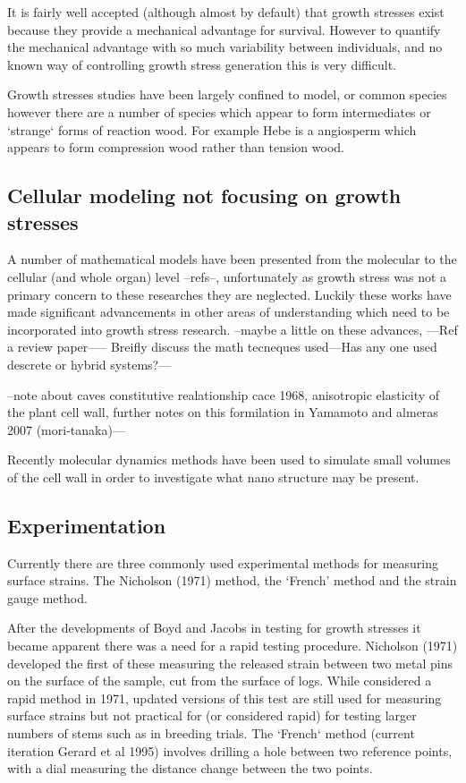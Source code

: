 \documentclass{article}
\begin{document}
It is fairly well accepted (although almost by default) that growth stresses
exist because they provide a mechanical advantage for survival. However to
quantify the mechanical advantage with so much variability between individuals,
and no known way of controlling growth stress generation this is very difficult.

Growth stresses studies have been largely confined to model, or common species
however there are a number of species which appear to form intermediates or
`strange` forms of reaction wood. For example Hebe is a angiosperm which appears
to form compression wood rather than tension wood.

\subsection{Cellular modeling not focusing on growth stresses}
A number of mathematical models have been presented from the
molecular to the cellular (and whole organ) level --refs--, unfortunately as
growth stress was not a primary concern to these researches they are neglected.
Luckily these works have made significant advancements in other areas of
understanding which need to be incorporated into growth stress research. --maybe
a little on these advances, ---Ref a review paper----- Breifly discuss the math
tecneques used---Has any one used descrete or hybrid systems?---

--note about caves constitutive realationship cace 1968, anisotropic
elasticity of the plant cell wall, further notes on this formilation in Yamamoto
and almeras 2007 (mori-tanaka)---

Recently molecular dynamics methods have been used to simulate small volumes of
the cell wall in order to investigate what nano structure may be present.

\subsection{Experimentation}
Currently there are three commonly used experimental methods for measuring
surface strains. The Nicholson (1971) method, the `French' method and the strain
gauge method.

After the developments of Boyd and Jacobs in testing for growth stresses it
became apparent there was a need for a rapid testing procedure. Nicholson (1971)
developed the first of these measuring the released strain between two metal pins
on the surface of the sample, cut from the surface of logs. While considered a
rapid method in 1971, updated versions of this test are still used for measuring
surface strains but not practical for (or considered rapid) for testing larger
numbers of stems such as in breeding trials. The `French` method (current
iteration Gerard et al 1995) involves drilling a hole between two reference
points, with a dial measuring the distance change between the two points.
\end{document}
